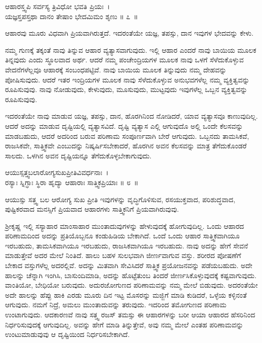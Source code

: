 \begin{shloka}
ಆಹಾರಸ್ತ್ವಪಿ ಸರ್ವಸ್ಯ ತ್ರಿವಿಧೋ ಭವತಿ ಪ್ರಿಯಃ~।\\ಯಜ್ಞಸ್ತಪಸ್ತಥಾ ದಾನಂ ತೇಷಾಂ ಭೇದಮಿಮಂ ಶೃಣು \hfill॥ ೭~॥
\end{shloka}

\begin{artha}
ಆಹಾರವು ಮೂರು ವಿಧವಾಗಿ ಪ್ರಿಯವಾಗಿರುತ್ತದೆ. ಇದರಂತೆಯೇ ಯಜ್ಞ, ತಪಸ್ಸು, ದಾನ ಇವುಗಳ ಭೇದವನ್ನು ಕೇಳು.
\end{artha}

ನಮ್ಮ ಗುಣಕ್ಕೆ ತಕ್ಕಂತೆ ನಾವು ತಿನ್ನುವ ಆಹಾರ ವ್ಯತ್ಯಾಸವಾಗುವುದು. ಇಲ್ಲಿ ಆಹಾರ ಎಂದರೆ ನಾವು ಬಾಯಿಯ ಮೂಲಕ ತಿನ್ನವುದು ಎಂದು ಸ್ಥೂಲವಾದ ಅರ್ಥ. ಆದರೆ ನಮ್ಮ ಪಂಚೇಂದ್ರಿಯಗಳ ಮೂಲಕ ನಾವು ಒಳಗೆ ಸೆಳೆದುಕೊಳ್ಳುವ ವೇದನೆಗಳೆಲ್ಲವೂ ಆಹಾರಕ್ಕೆ ಸಂಬಂಧಪಟ್ಟಿವೆ. ನಾವು ಬಾಯಿಯ ಮೂಲಕ ತಿನ್ನುವುದು ನಮ್ಮ ದೇಹವನ್ನು ಪೋಷಿಸುವುದು. ಆದರೆ ಇತರ ಇಂದ್ರಿಯಗಳ ಮೂಲಕ ನಾವು ಸೆಳೆದುಕೊಳ್ಳುವ ಅನುಭವಗಳೆಲ್ಲ ನಮ್ಮ ವ್ಯಕ್ತಿತ್ವವನ್ನು ರೂಪಿಸುವುವು. ನಾವು ನೋಡುವುದು, ಕೇಳುವುದು, ಮೂಸುವುದು, ಮುಟ್ಟವುದು ಇವುಗಳೆಲ್ಲ ಒಬ್ಬನ ವ್ಯಕ್ತಿತ್ವವನ್ನು ರೂಪಿಸುವುವು.

ಇದರಂತೆಯೇ ನಾವು ಮಾಡುವ ಯಜ್ಞ, ತಪಸ್ಸು, ದಾನ, ಹೊರಗಿನಿಂದ ನೋಡಿದರೆ, ಯಾವ ವ್ಯತ್ಯಾಸವೂ ಕಾಣುವುದಿಲ್ಲ. ಆದರೆ ಅದನ್ನು ಮಾಡುವ ದೃಷ್ಟಿಯಲ್ಲಿ ವ್ಯತ್ಯಾಸವಿದೆ. ದೃಷ್ಟಿ ವ್ಯತ್ಯಾಸ ಎಲ್ಲಿ ಆಗುವುದೊ ಅಲ್ಲಿ ಒಂದೇ ಕೆಲಸವನ್ನು ಮಾಡಬಹುದು, ಆದರೆ ಅದರಿಂದ ಬರುವ ಪರಿಣಾಮ ಸಂಪೂರ್ಣವಾಗಿ ಬೇರೆ ಆಗುವುದು. ಒಬ್ಬನದು ತಾಮಸಿಕವೆ, ರಾಜಸಿಕವೇ, ಸಾತ್ತ್ವಿಕವೇ ಎಂಬುದನ್ನು ನಿಷ್ಕರ್ಷಿಸಬೇಕಾದರೆ, ಹೊರಗಿನ ಅವನ ಕೆಲಸವನ್ನು ಮಾತ್ರ ತೆಗೆದುಕೊಂಡರೆ ಸಾಲದು. ಒಳಗಿನ ಅವನ ದೃಷ್ಟಿಯನ್ನೂ ತೆಗೆದುಕೊಳ್ಳಬೇಕಾಗುವುದು.

\begin{shloka}
ಆಯುಸ್ಸತ್ತ್ವಬಲಾರೋಗ್ಯಸುಖಪ್ರೀತಿವಿವರ್ಧನಾಃ~।\\ರಸ್ಯಾಃ ಸ್ನಿಗ್ಧಾಃ ಸ್ಥಿರಾ ಹೃದ್ಯಾ ಆಹಾರಾಃ ಸಾತ್ತ್ವಿಕಪ್ರಿಯಾಃ \hfill॥ ೮~॥
\end{shloka}

\begin{artha}
ಆಯುಸ್ಸು ಸತ್ತ್ವ ಬಲ ಆರೋಗ್ಯ ಸುಖ ಪ್ರೀತಿ ಇವುಗಳನ್ನು ವೃದ್ಧಿಗೊಳಿಸುವ, ರಸಯುಕ್ತವಾದ, ಪರಿಶುದ್ಧವಾದ, ಪುಷ್ಟಿಕರವಾದ ಮನಸ್ಸಿಗೆ ಪ್ರಿಯವಾದ ಆಹಾರಗಳು ಸಾತ್ತ್ವಿಕನಿಗೆ ಪ್ರಿಯ\-ವಾಗಿರುವುವು.
\end{artha}

ಶ‍್ರೀಕೃಷ್ಣ ಇಲ್ಲಿ ಸಸ್ಯಾಹಾರ ಮಾಂಸಾಹಾರ ಮುಂತಾದುವುಗಳನ್ನು ಹೇಳುವುದಕ್ಕೆ ಹೋಗುವುದಿಲ್ಲ. ಒಂದು ಆಹಾರದ ಪರಿಣಾಮದಿಂದ ಅದನ್ನು ಪ್ರತಿಯೊಬ್ಬನೂ ಕಂಡುಹಿಡಿಯ ಬೇಕಾಗಿದೆ. ಒಂದೆ ಒಂದು ಆಹಾರ ಸಾತ್ತ್ವಿಕವಾಗಿಯೂ ಇರಬಹುದು, ತಾಮಸಿಕವಾಗಿಯೂ ಇರಬಹುದು, ರಾಜಸಿಕವಾಗಿಯೂ ಇರಬಹುದು. ನಾವು ಅದನ್ನು ಹೇಗೆ ಸೇವನೆ ಮಾಡುತ್ತೇವೆ ಅದರ ಮೇಲೆ ನಿಂತಿದೆ. ಹಾಲು ಬಹಳ ಸುಲಭವಾಗಿ ಜೀರ್ಣವಾಗುವ ವಸ್ತು. ಶರೀರದ ಪೋಷಣೆಗೆ ಬೇಕಾದ ವಸ್ತುಗಳೆಲ್ಲ ಅದರಲ್ಲಿವೆ. ಅದನ್ನು ಮಿತವಾಗಿ ಸೇವಿಸಿದರೆ ಸಾತ್ತ್ವಿಕ ಪ್ರಯೋಜನವನ್ನು ಪಡೆಯಬಹುದು. ಅದೇ ಹಾಲನ್ನು ಚೆನ್ನಾಗಿ ಇಂಗಿಸಿ, ಬಾಸುಂದಿಮಾಡಿ, ಅದನ್ನು ಹೊಟ್ಟೆತುಂಬ ತಿಂದರೆ ಜೀರ್ಣಸಿಕೊಳ್ಳುವುದಕ್ಕೆ ಕಷ್ಟವಾಗುವುದು. ವಾಂತಿಯೋ, ಬೇಧಿಯೋ ಬರುವುದು. ಅದು\break ರಜೋಗುಣದ ಪರಿಣಾಮವನ್ನು ನಮ್ಮ ಮೇಲೆ ಬಿಡುವುದು. ಅದರಂತೆಯೇ ಅದೇ ಹಾಲನ್ನು ಹೆಪ್ಪು ಹಾಕಿ ಎರಡು ಮೂರು ದಿನ ಇಟ್ಟ ಮೊಸರನ್ನು ಮಜ್ಜಿಗೆ ಮಾಡಿ ಕುಡಿದರೆ, ಒಳ್ಳೆಯ ಕಳ್ಳಿನಂತೆ ಆಗುವುದು. ನಮಗೆ ನಿದ್ರೆ, ಅಮಲು ಮುಂತಾದುವನ್ನು ತರುವುದು. ಇದರಿಂದ ತಮೋಗುಣದ ಪರಿಣಾಮ ಉಂಟಾಗುವುದು. ಆದಕಾರಣವೆ ನಾವು ಸತ್ತ್ವ ರಜಸ್ ತಮಸ್ಸು ಈ ಆಹಾರಗಳನ್ನು ಬರೀ ಆಯಾ ಆಹಾರದ ಹೆಸರಿನಿಂದ ನಿರ್ಧರಿಸುವುದಕ್ಕೆ ಆಗುವುದಿಲ್ಲ. ಅವನ್ನು ಹೇಗೆ ಮಾಡಿ ತಿನ್ನುತ್ತೇವೆ, ಅವು ನಮ್ಮ ಮೇಲೆ ಎಂತಹ ಪರಿಣಾಮವನ್ನು ಉಂಟುಮಾಡುವುವು ಆ ದೃಷ್ಟಿಯಿಂದ ನಿರ್ಧರಿಸಬೇಕಾಗಿದೆ.

